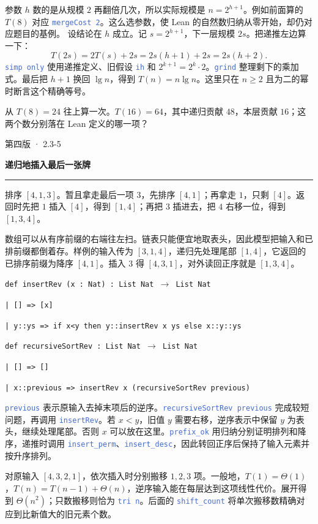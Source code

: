 \documentclass[UTF8,11pt,a4paper,fontset=fandol]{ctexart}
\newcommand{\HandoutLesson}[2]{%
  \par{\small\heiti\color{BrickRed}#1}\par\vspace{3pt}
  {\fontsize{21}{27}\selectfont\heiti\bfseries #2}\par
  \textcolor{BrickRed}{\rule{\linewidth}{.7pt}}\par}
\newcommand{\HandoutBox}[1]{%
  \par\noindent\begingroup\setlength{\fboxsep}{8pt}%
  \colorbox{BrickRed!9}{\parbox{\dimexpr\linewidth-16pt\relax}{#1}}\endgroup\par}
\newcommand{\src}[1]{\textcolor{RoyalBlue}{\texttt{#1}}}
\newcommand{\subhead}[1]{\par\vspace{3pt}{\heiti\bfseries\color{RoyalBlue}#1}\par}
\newenvironment{leanblock}{\par\smallskip\noindent\begin{lrbox}{\leanbox}\begin{minipage}{\dimexpr\linewidth-12pt\relax}\raggedright\small\setlength{\parskip}{0pt}}{\end{minipage}\end{lrbox}\colorbox{RoyalBlue!6}{\usebox{\leanbox}}\par\smallskip}
\newcommand{\lineofcode}[2]{\noindent\hspace*{#1em}\strut\texttt{#2}\par}
\begin{document}
参数 $h$ 数的是从规模 $2$ 再翻倍几次，所以实际规模是 $n=2^{h+1}$。例如前面算的 $T(8)$ 对应 \src{mergeCost 2}。这么选参数，使 Lean 的自然数归纳从零开始，却仍对应题目的基例。
设结论在 $h$ 成立。记 $s=2^{h+1}$，下一层规模 $2s$。把递推左边算一下：
\[
 T(2s)=2T(s)+2s=2s(h+1)+2s=2s(h+2).
\]
\src{simp only} 使用递推定义、旧假设 \src{ih} 和 $2^{k+1}=2^k\cdot2$。\src{grind} 整理剩下的乘加式。最后把 $h+1$ 换回 $\lg n$，得到 $T(n)=n\lg n$。这里只在 $n\ge2$ 且为二的幂时断言这个精确等号。
\HandoutBox{从 $T(8)=24$ 往上算一次。$T(16)=64$，其中递归贡献 $48$，本层贡献 $16$；这两个数分别落在 Lean 定义的哪一项？}
\par{}
\clearpage{}\label{p34}\HandoutLesson{第四版 · 2.3-5}{递归地插入最后一张牌}
排序 $[4,1,3]$。暂且拿走最后一项 $3$，先排序 $[4,1]$；再拿走 $1$，只剩 $[4]$。返回时先把 $1$ 插入 $[4]$，得到 $[1,4]$；再把 $3$ 插进去，把 $4$ 右移一位，得到 $[1,3,4]$。
\subhead{让靠右的数先被读到}
数组可以从有序前缀的右端往左扫。链表只能便宜地取表头，因此模型把输入和已排前缀都倒着存。样例的输入传为 $[3,1,4]$，递归先处理尾部 $[1,4]$，它返回的已排序前缀为降序 $[4,1]$。插入 $3$ 得 $[4,3,1]$，对外读回正序就是 $[1,3,4]$。
\begin{leanblock}
\lineofcode{0.0}{def insertRev (x : Nat) : List Nat \ensuremath{\to} List Nat}
\lineofcode{0.9}{| [] => [x]}
\lineofcode{0.9}{| y::ys => if x<y then y::insertRev x ys else x::y::ys}
\end{leanblock}
\begin{leanblock}
\lineofcode{0.0}{def recursiveSortRev : List Nat \ensuremath{\to} List Nat}
\lineofcode{0.9}{| [] => []}
\lineofcode{0.9}{| x::previous => insertRev x (recursiveSortRev previous)}
\end{leanblock}
\src{previous} 表示原输入去掉末项后的逆序。\src{recursiveSortRev previous} 完成较短问题，再调用 \src{insertRev}。若 $x<y$，旧值 $y$ 需要右移，逆序表示中保留 $y$ 为表头，继续处理尾部。否则 $x$ 可以放在这里。\src{prefix\_ok} 用归纳分别证明排列和降序，递推时调用 \src{insert\_perm}、\src{insert\_desc}，因此转回正序后保持了输入元素并按升序排列。
\subhead{每层最坏代价}
对原输入 $[4,3,2,1]$，依次插入时分别搬移 $1,2,3$ 项。一般地，$T(1)=\Theta(1)$，$T(n)=T(n-1)+\Theta(n)$，逆序输入能在每层达到这项线性代价。展开得到 $\Theta(n^2)$；只数搬移则恰为 \src{tri n}。后面的 \src{shift\_count} 将单次搬移数精确对应到比新值大的旧元素个数。
\par{}
\end{document}
